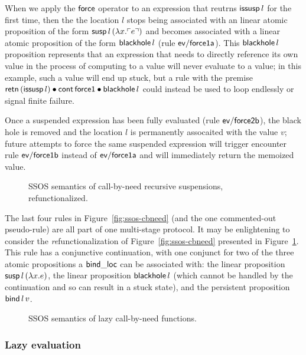 When we apply the ${\sf force}$ operator to an expression that reutrns
${\sf issusp}\,l$ for the first time, then the the location $l$ stops
being associated with an linear atomic proposition of the form ${\sf
  susp}\,l\,(\lambda x.{\ulcorner{e}\urcorner})$ and becomes associated with a
linear atomic proposition of the form ${\sf blackhole}\,l$ (rule ${\sf
  ev/force1a}$). This ${\sf blackhole}\,l$ proposition represents that
an expression that needs to directly reference its own value in the
process of computing to a value will never evaluate to a value; in
this example, such a value will end up stuck, but a rule with the
premise ${\sf retn}\,({\sf issusp}\,l) \mathbin{\bullet} {\sf cont}\,{\sf force1}
\mathbin{\bullet} {\sf blackhole}\,l$ could instead be used to loop endlessly 
or signal finite failure. 

Once a suspended expression has been fully evaluated (rule ${\sf ev/force2b}$),
the black hole is removed and the location $l$ is permanently assocaited
with the value $v$; future attempts to force the same suspended
expression will trigger encounter rule ${\sf ev/force1b}$ instead of 
${\sf ev/force1a}$ and will immediately return the memoized value.

\begin{figure}
\caption{SSOS semantics of call-by-need recursive suspensions, refunctionalized.}
\label{fig:ssos-cbneed-refun}
\end{figure}

The last four rules in Figure~\ref{fig:ssos-cbneed} (and the one
commented-out pseudo-rule) are all part of one multi-stage protocol.
It may be enlightening to consider the {\it re}functionalization of
Figure~\ref{fig:ssos-cbneed} presented in
Figure~\ref{fig:ssos-cbneed-refun}. This rule has a conjunctive
continuation, with one conjunct for two of the three atomic propositions a
${\sf bind\_loc}$ can be associated with: the linear proposition
${\sf susp}\,l\,(\lambda x.e)$, the linear proposition 
${\sf blackhole}\,l$ (which cannot be handled by the continuation and 
so can result in a stuck state), and the persistent proposition
${\sf bind}\,l\,v$. 

\begin{figure}
\caption{SSOS semantics of lazy call-by-need functions.}
\label{fig:ssos-by-need}
\end{figure}


\subsubsection{Lazy evaluation}

